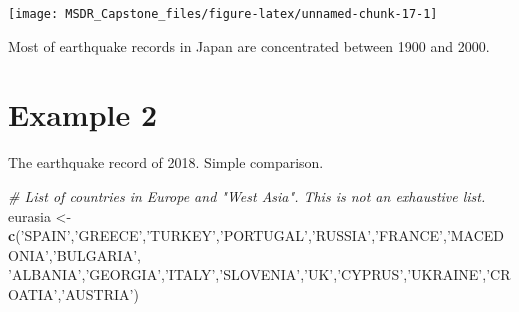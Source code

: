 \documentclass[]{book}
\newenvironment{Shaded}{\begin{snugshade}}{\end{snugshade}}
\newcommand{\KeywordTok}[1]{\textcolor[rgb]{0.13,0.29,0.53}{\textbf{#1}}}
\newcommand{\StringTok}[1]{\textcolor[rgb]{0.31,0.60,0.02}{#1}}
\newcommand{\CommentTok}[1]{\textcolor[rgb]{0.56,0.35,0.01}{\textit{#1}}}
\newcommand{\NormalTok}[1]{#1}
\begin{document}
\texttt{[image: MSDR\_Capstone\_files/figure-latex/unnamed-chunk-17-1]}

Most of earthquake records in Japan are concentrated between 1900 and
2000.

\section{Example 2}\label{example_2}

The earthquake record of 2018. Simple comparison.

\begin{Shaded}
\begin{Highlighting}[]
\CommentTok{# List of countries in Europe and "West Asia". This is not an exhaustive list.}
\NormalTok{eurasia <-}\StringTok{ }\KeywordTok{c}\NormalTok{(}\StringTok{'SPAIN'}\NormalTok{,}\StringTok{'GREECE'}\NormalTok{,}\StringTok{'TURKEY'}\NormalTok{,}\StringTok{'PORTUGAL'}\NormalTok{,}\StringTok{'RUSSIA'}\NormalTok{,}\StringTok{'FRANCE'}\NormalTok{,}\StringTok{'MACEDONIA'}\NormalTok{,}\StringTok{'BULGARIA'}\NormalTok{,}
             \StringTok{'ALBANIA'}\NormalTok{,}\StringTok{'GEORGIA'}\NormalTok{,}\StringTok{'ITALY'}\NormalTok{,}\StringTok{'SLOVENIA'}\NormalTok{,}\StringTok{'UK'}\NormalTok{,}\StringTok{'CYPRUS'}\NormalTok{,}\StringTok{'UKRAINE'}\NormalTok{,}\StringTok{'CROATIA'}\NormalTok{,}\StringTok{'AUSTRIA'}\NormalTok{)}


\end{Highlighting}
\end{Shaded}
\end{document}
